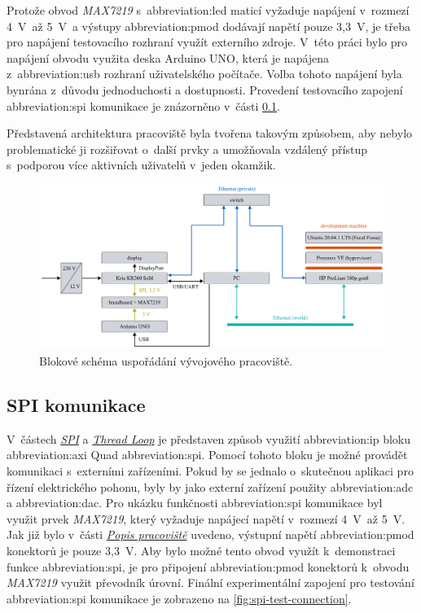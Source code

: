\documentclass[a4paper, twoside, 11pt]{article}
\newcommand{\fbar}{\FloatBarrier}
\begin{document}
	Protože obvod \textit{MAX7219} s~\gls{abbreviation:led} maticí vyžaduje napájení v~rozmezí 4~V~až 5~V~a výstupy \gls{abbreviation:pmod} dodávají napětí pouze 3,3~V, je třeba pro napájení testovacího rozhraní využít externího zdroje. V~této práci bylo pro napájení obvodu využita deska Arduino UNO, která je napájena z~\gls{abbreviation:usb} rozhraní uživatelského počítače. Volba tohoto napájení byla bynrána z~důvodu jednoduchosti a dostupnosti. Provedení testovacího zapojení \gls{abbreviation:spi} komunikace je znázorněno v~části \ref{subsec:spi-komunikace}.\par
	Představená architektura pracoviště byla tvořena takovým způsobem, aby nebylo problematické ji rozšiřovat o~další prvky a umožňovala vzdálený přístup s~podporou více aktivních uživatelů v~jeden okamžik.


\begin{figure}[htbp!]
	\centering
	\includegraphics[width=1\textwidth]{src/pdf/workspace-scheme.pdf}
	\caption{Blokové schéma uspořádání vývojového pracoviště.}
	\label{fig:workspace-scheme}
\end{figure}

	\fbar
	\subsection{SPI komunikace}\label{subsec:spi-komunikace}
	V~částech \hyperref[subsec:spi]{\textit{SPI}} a \hyperref[subsubsec:thread-loop]{\textit{Thread Loop}} je představen způsob využití \gls{abbreviation:ip} bloku \gls{abbreviation:axi} Quad \gls{abbreviation:spi}. Pomocí tohoto bloku je možné provádět komunikaci s~externími zařízeními. Pokud by se jednalo o~skutečnou aplikaci pro řízení elektrického pohonu, byly by jako externí zařízení použity \gls{abbreviation:adc} a \gls{abbreviation:dac}. Pro ukázku funkčnosti \gls{abbreviation:spi} komunikace byl využit prvek \textit{MAX7219}, který vyžaduje napájecí napětí v~rozmezí 4~V~až 5~V. Jak již bylo v~části \hyperref[sec:popis-pracoviste]{\textit{Popis pracoviště}} uvedeno, výstupní napětí \gls{abbreviation:pmod} konektorů je pouze 3,3~V. Aby bylo možné tento obvod využít k~demonstraci funkce \gls{abbreviation:spi}, je pro připojení \gls{abbreviation:pmod} konektorů k~obvodu \textit{MAX7219} využit převodník úrovní. Finální experimentální zapojení pro testování \gls{abbreviation:spi} komunikace je zobrazeno na \ref{fig:spi-test-connection}.\par
\end{document}
